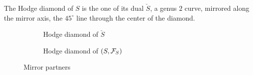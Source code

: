 \documentclass[../main.tex]{subfiles}
\begin{document}
The Hodge diamond of $S$ is the one of its dual $\check{S}$, a genus $2$ curve, mirrored along the mirror axis, the $45^\circ$ line through the center of the diamond.


\begin{figure}[ht]
  \begin{subfigure}[b]{0.4\textwidth}
    \centering 
{}
    \caption{Hodge diamond of $\check{S}$}
    \label{S_check_diamond}
  \end{subfigure}
  \hfill
  \begin{subfigure}[b]{0.4\textwidth}
 \centering 
{}

    \caption{Hodge diamond of ${(S,\mathcal{F}_S)}$}
    \label{S_diamond}
  \end{subfigure}
  \caption{Mirror partners}
\end{figure}
\end{document}
